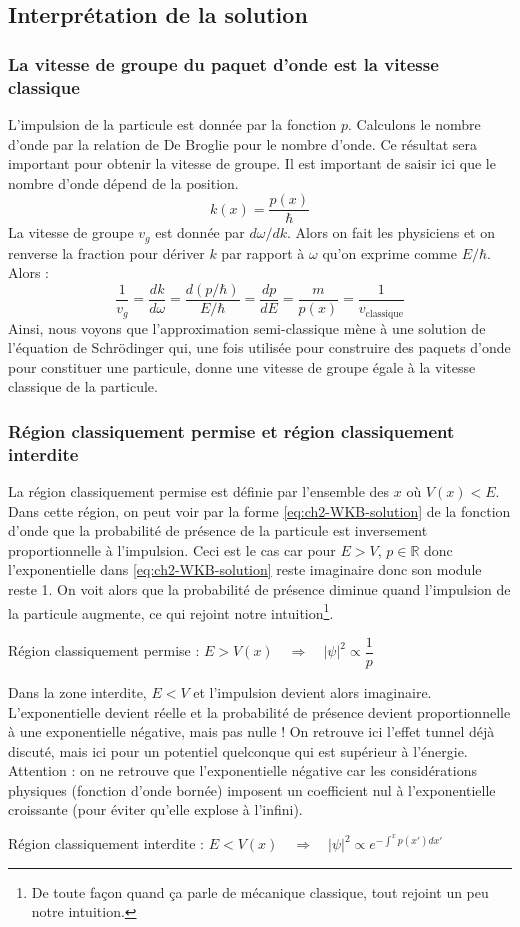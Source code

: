 \documentclass{book}
\begin{document}
\subsection{Interprétation de la solution}

\subsubsection{La vitesse de groupe du paquet d'onde est la vitesse classique}
L'impulsion de la particule est donnée par la fonction $p$. Calculons le nombre d'onde par la relation de De Broglie pour le nombre d'onde. Ce résultat sera important pour obtenir la vitesse de groupe. Il est important de saisir ici que le nombre d'onde dépend de la position.
$$k(x) = \dfrac{p(x)}{\hbar}$$
La vitesse de groupe $v_g$ est donnée par $d\omega/d k$. Alors on fait les physiciens et on renverse la fraction pour dériver $k$ par rapport à $\omega$ qu'on exprime comme $E/\hbar$. Alors :
$$\dfrac{1}{v_g} = \dfrac{d k}{d \omega} = \dfrac{d (p/\hbar)}{E/\hbar} = \dfrac{d p }{d E} = \dfrac{m}{p(x)}=  \dfrac{1}{v_{\text{classique}}}$$
Ainsi, nous voyons que l'approximation semi-classique mène à une solution de l'équation de Schrödinger qui, une fois utilisée pour construire des paquets d'onde pour constituer une particule, donne une vitesse de groupe égale à la vitesse classique de la particule.

\subsubsection{Région classiquement permise et région classiquement interdite}
La région classiquement permise est définie par l'ensemble des $x$ où $V(x) < E$. Dans cette région, on peut voir par la forme \ref{eq:ch2-WKB-solution} de la fonction d'onde que la probabilité de présence de la particule est inversement proportionnelle à l'impulsion. Ceci est le cas car pour $E>V$, $p\in \mathbb{R}$ donc l'exponentielle dans \ref{eq:ch2-WKB-solution} reste imaginaire donc son module reste 1. On voit alors que la probabilité de présence diminue quand l'impulsion de la particule augmente, ce qui rejoint notre intuition\footnote{De toute façon quand ça parle de mécanique classique, tout rejoint un peu notre intuition.}.
\begin{center}
  Région classiquement permise : $E>V(x) \quad \Rightarrow \quad |\psi|^2 \propto \dfrac{1}{p}$
\end{center}

Dans la zone interdite, $E<V$ et l'impulsion devient alors imaginaire. L'exponentielle devient réelle et la probabilité de présence devient proportionnelle à une exponentielle négative, mais pas nulle ! On retrouve ici l'effet tunnel déjà discuté, mais ici pour un potentiel quelconque qui est supérieur à l'énergie. Attention : on ne retrouve que l'exponentielle négative car les considérations physiques (fonction d'onde bornée) imposent un coefficient nul à l'exponentielle croissante (pour éviter qu'elle explose à l'infini).
\begin{center}
  Région classiquement interdite : $E<V(x) \quad \Rightarrow \quad |\psi|^2 \propto e^{-\int ^x p(x') d x'}$
\end{center}
\end{document}
